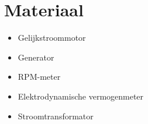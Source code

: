 \section{Materiaal}
\begin{itemize}
    \item Gelijkstroommotor
    \item Generator
    \item RPM-meter
    \item Elektrodynamische vermogenmeter
    \item Stroomtransformator
\end{itemize}